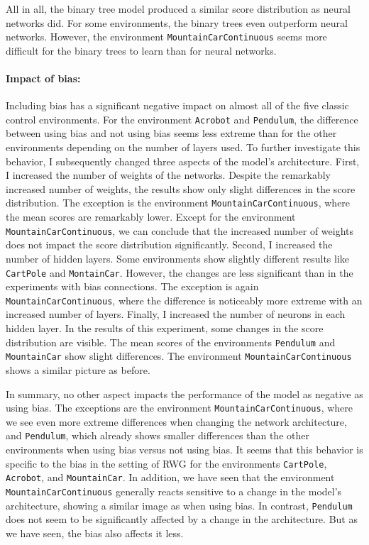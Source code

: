 All in all, the binary tree model produced a similar score distribution as neural networks did. For some environments, the binary trees even outperform neural networks. However, the environment \verb|MountainCarContinuous| seems more difficult for the binary trees to learn than for neural networks.

\paragraph*{Impact of bias:} Including bias has a significant negative impact on almost all of the five classic control environments. For the environment \verb|Acrobot| and \verb|Pendulum|, the difference between using bias and not using bias seems less extreme than for the other environments depending on the number of layers used. To further investigate this behavior, I subsequently changed three aspects of the model's architecture. First, I increased the number of weights of the networks. Despite the remarkably increased number of weights, the results show only slight differences in the score distribution. The exception is the environment \verb|MountainCarContinuous|, where the mean scores are remarkably lower. Except for the environment \verb|MountainCarContinuous|, we can conclude that the increased number of weights does not impact the score distribution significantly. Second, I increased the number of hidden layers. Some environments show slightly different results like \verb|CartPole| and \verb|MontainCar|. However, the changes are less significant than in the experiments with bias connections. The exception is again \verb|MountainCarContinuous|, where the difference is noticeably more extreme with an increased number of layers. Finally, I increased the number of neurons in each hidden layer. In the results of this experiment, some changes in the score distribution are visible. The mean scores of the environments \verb|Pendulum| and \verb|MountainCar| show slight differences. The environment \verb|MountainCarContinuous| shows a similar picture as before.

In summary, no other aspect impacts the performance of the model as negative as using bias. The exceptions are the environment \verb|MountainCarContinuous|, where we see even more extreme differences when changing the network architecture, and \verb|Pendulum|, which already shows smaller differences than the other environments when using bias versus not using bias. It seems that this behavior is specific to the bias in the setting of RWG for the environments \verb|CartPole|, \verb|Acrobot|, and \verb|MountainCar|. In addition, we have seen that the environment \verb|MountainCarContinuous| generally reacts sensitive to a change in the model's architecture, showing a similar image as when using bias. In contrast, \verb|Pendulum| does not seem to be significantly affected by a change in the architecture. But as we have seen, the bias also affects it less.
